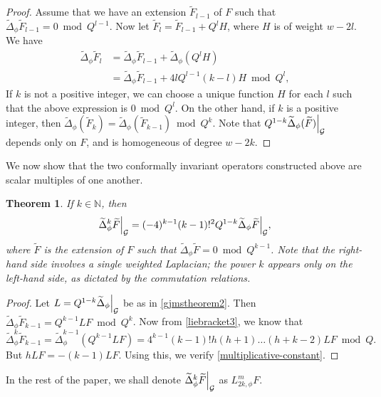 \documentclass{amsart}
\newcommand\restr[2]{{%
  \left.\kern-\nulldelimiterspace %
  #1 %
  \right|_{#2} %
  }}
\newtheorem{theorem}{Theorem}[section]
\begin{document}
\begin{proof}
Assume that we have an extension $\widetilde{F}_{l-1}$ of $F$ such that $\widetilde{\Delta}_\phi\widetilde{F}_{l-1}=0\bmod Q^{l-1}$. Now let $\widetilde{F}_l=\widetilde{F}_{l-1}+Q^l H$, where $H$ is of weight $w-2l$. We have
\begin{equation*}
\begin{aligned}
\widetilde{\Delta}_\phi\widetilde{F}_l&=\widetilde{\Delta}_\phi\widetilde{F}_{l-1}+\widetilde{\Delta}_\phi(Q^l H)\\
&=\widetilde{\Delta}_\phi\widetilde{F}_{l-1}+4lQ^{l-1}(k-l)H\bmod Q^l,
\end{aligned}
\end{equation*}
If $k$ is not a positive integer, we can choose a unique function $H$ for each $l$ such that the above expression is $0\bmod Q^l$. On the other hand, if $k$ is a positive integer, then $\widetilde{\Delta}_\phi(\widetilde{F}_k)=\widetilde{\Delta}_\phi(\widetilde{F}_{k-1}) \bmod Q^k$. Note that $\restr{Q^{1-k}\widetilde{\Delta}_\phi(\widetilde{F})}{{\mathcal{G}}}$ depends only on $F$, and is homogeneous of degree $w-2k$. 
\end{proof}
We now show that the two conformally invariant operators constructed above are scalar multiples of one another.
\begin{theorem}
If $k\in\mathbb{N}$, then
\begin{equation}
\label{multiplicative-constant}
\restr{\widetilde{\Delta}_\phi^k\widetilde{F}}{{\mathcal{G}}}=(-4)^{k-1}(k-1)!^2 \restr{Q^{1-k}\widetilde{\Delta}_\phi \widetilde{F}}{{\mathcal{G}}},
\end{equation} where $\widetilde{F}$ is the extension of $F$ such that $\widetilde{\Delta}_\phi\widetilde{F}=0\bmod Q^{k-1}$.  
{Note that the right-hand side involves a single weighted Laplacian; the power $k$ appears only on the left-hand side, as dictated by the commutation relations.}
\end{theorem}

\begin{proof}
Let $L=\restr{Q^{1-k}\widetilde{\Delta}_\phi}{{\mathcal{G}}}$ be as in \cref{gjmstheorem2}. Then $\widetilde{\Delta}_\phi\widetilde{F}_{k-1}=Q^{k-1}LF \bmod Q^k$. Now from \cref{liebracket3}, we know that 
\begin{equation*}
   \widetilde{\Delta}_\phi^k\widetilde{F}_{k-1}=\widetilde{\Delta}_\phi^{k-1}(Q^{k-1}LF)=4^{k-1}(k-1)!h(h+1)\dots(h+k-2) LF\bmod Q.
\end{equation*} 
But $hLF=-(k-1)LF$. Using this, we verify \cref{multiplicative-constant}.
\end{proof}
In the rest of the paper, we shall denote $\restr{\widetilde{\Delta}_\phi^k\widetilde{F}}{{\mathcal{G}}}$ as $L^m_{2k,\phi}F$.
\end{document}
